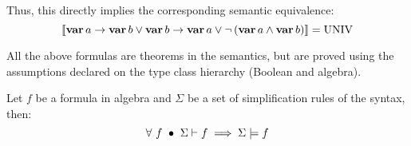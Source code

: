 Thus, this directly implies the corresponding semantic equivalence:
\[
\left[\!\left[\operatorname{\mathbf{var}} a \rightarrow \operatorname{\mathbf{var}} b \lor 
	\operatorname{\mathbf{var}} b \rightarrow \operatorname{\mathbf{var}} a \lor 
	\lnot \left(\operatorname{\mathbf{var}} a \land \operatorname{\mathbf{var}} b\right)\right]\!\right] = \operatorname{UNIV}
\]

All the above formulas are theorems in the semantics, but are proved using the assumptions declared on the type class hierarchy (Boolean and \ac{algebra}).





\begin{proposition}[Soundness]
Let $f$ be a formula in \ac{algebra} and $\Sigma$ be a set of simplification rules of the syntax, then:
%
\begin{equation}
\forall~ f ~\bullet~ \Sigma\vdash{f} \implies \Sigma\models{f}
\label{prop:soundness}
\end{equation}
%
\end{proposition}

